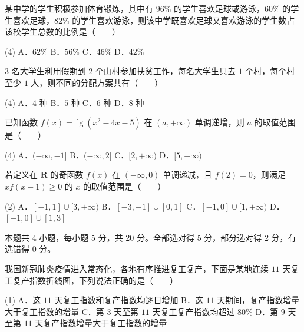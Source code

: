 某中学的学生积极参加体育锻炼，其中有 $96\%$ 的学生喜欢足球或游泳，$60\%$ 的学生喜欢足球，$82\%$ 的学生喜欢游泳，则该中学既喜欢足球又喜欢游泳的学生数占该校学生总数的比例是（　　）

\begin{gkopts}(4)
\task A．$62\%$
\task B．$56\%$
\task C．$46\%$
\task D．$42\%$
\end{gkopts}

$3$ 名大学生利用假期到 $2$ 个山村参加扶贫工作，每名大学生只去 $1$ 个村，每个村至少 $1$ 人，则不同的分配方案共有（　　）

\begin{gkopts}(4)
\task A．$4$ 种
\task B．$5$ 种
\task C．$6$ 种
\task D．$8$ 种
\end{gkopts}

已知函数 $f(x)=\lg\left(x^{2}-4x-5\right)$ 在 $(a,+\infty)$ 单调递增，则 $a$ 的取值范围是（　　）

\begin{gkopts}(4)
\task A．$(-\infty,-1]$
\task B．$(-\infty,2]$
\task C．$[2,+\infty)$
\task D．$[5,+\infty)$
\end{gkopts}

若定义在 $\mathbf R$ 的奇函数 $f(x)$ 在 $(-\infty,0)$ 单调递减，且 $f(2)=0$，则满足 $xf(x-1)\ge0$ 的 $x$ 的取值范围是（　　）

\begin{gkopts}(2)
\task A．$[-1,1]\cup[3,+\infty)$
\task B．$[-3,-1]\cup[0,1]$
\task C．$[-1,0]\cup[1,+\infty)$
\task D．$[-1,0]\cup[1,3]$
\end{gkopts}

\par\medskip


\begin{gktip}
本题共 4 小题，每小题 5 分，共 20 分。全部选对得 5 分，部分选对得 2 分，有选错得 0 分。
\end{gktip}

我国新冠肺炎疫情进入常态化，各地有序推进复工复产，下面是某地连续 $11$ 天复工复产指数折线图，下列说法正确的是（　　）

\begin{center}\end{center}

\begin{gkopts}(1)
\task A．这 $11$ 天复工指数和复产指数均逐日增加
\task B．这 $11$ 天期间，复产指数增量大于复工指数的增量
\task C．第 $3$ 天至第 $11$ 天复工复产指数均超过 $80\%$
\task D．第 $9$ 天至第 $11$ 天复产指数增量大于复工指数的增量
\end{gkopts}

